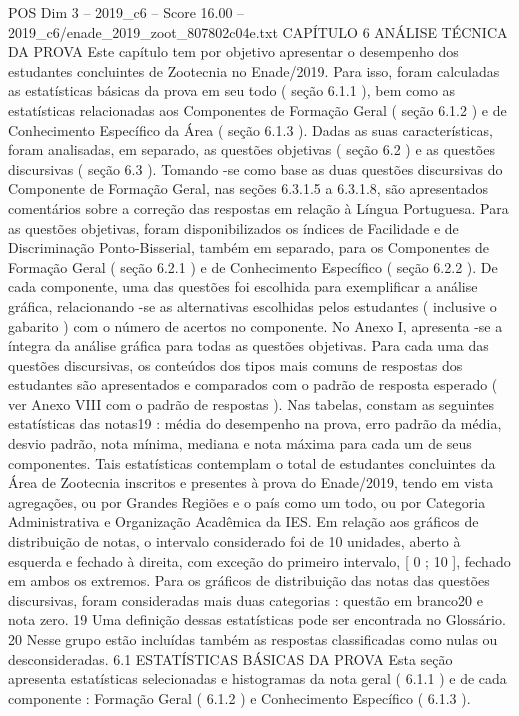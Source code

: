 \begin{textsample}{POS Dim 3 – 2019\_c6 – Score 16.00 – 2019\_c6/enade\_2019\_zoot\_807802c04e.txt}  \label{ex:f3_pos_017}
CAPÍTULO 6 ANÁLISE TÉCNICA DA PROVA Este capítulo tem por objetivo apresentar o desempenho dos estudantes concluintes de Zootecnia no Enade/2019.
Para isso, foram calculadas as estatísticas básicas da prova em seu todo ( seção 6.1.1 ), bem como as estatísticas relacionadas aos Componentes de Formação Geral ( seção 6.1.2 ) e de Conhecimento Específico da Área ( seção 6.1.3 ).
Dadas as suas características, foram analisadas, em separado, as questões objetivas ( seção 6.2 ) e as questões discursivas ( seção 6.3 ).
Tomando -se como base as duas questões discursivas do Componente de Formação Geral, nas seções 6.3.1.5 a 6.3.1.8, são apresentados comentários sobre a correção das respostas em relação à Língua Portuguesa.
Para as questões objetivas, foram disponibilizados os índices de Facilidade e de Discriminação Ponto-Bisserial, também em separado, para os Componentes de Formação Geral ( seção 6.2.1 ) e de Conhecimento Específico ( seção 6.2.2 ).
De cada componente, uma das questões foi escolhida para exemplificar a análise gráfica, relacionando -se as alternativas escolhidas pelos estudantes ( inclusive o gabarito ) com o número de acertos no componente.
No Anexo I, apresenta -se a íntegra da análise gráfica para todas as questões objetivas.
Para cada uma das questões discursivas, os conteúdos dos tipos mais comuns de respostas dos estudantes são apresentados e comparados com o padrão de resposta esperado ( ver Anexo VIII com o padrão de respostas ).
Nas tabelas, constam as seguintes estatísticas das notas19 : média do desempenho na prova, erro padrão da média, desvio padrão, nota mínima, mediana e nota máxima para cada um de seus componentes.
Tais estatísticas contemplam o total de estudantes concluintes da Área de Zootecnia inscritos e presentes à prova do Enade/2019, tendo em vista agregações, ou por Grandes Regiões e o país como um todo, ou por Categoria Administrativa e Organização Acadêmica da IES.
Em relação aos gráficos de distribuição de notas, o intervalo considerado foi de 10 unidades, aberto à esquerda e fechado à direita, com exceção do primeiro intervalo, [ 0 ; 10 ], fechado em ambos os extremos.
Para os gráficos de distribuição das notas das questões discursivas, foram consideradas mais duas categorias : questão em branco20 e nota zero. 19 Uma definição dessas estatísticas pode ser encontrada no Glossário. 20 Nesse grupo estão incluídas também as respostas classificadas como nulas ou desconsideradas. 6.1 ESTATÍSTICAS BÁSICAS DA PROVA Esta seção apresenta estatísticas selecionadas e histogramas da nota geral ( 6.1.1 ) e de cada componente : Formação Geral ( 6.1.2 ) e Conhecimento Específico ( 6.1.3 ).

\end{textsample}
